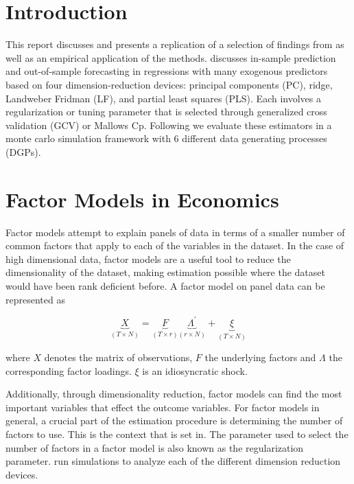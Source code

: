 \renewcommand{\contentsname}{Table of Contents}
\tableofcontents

\newpage

\section{Introduction} \label{sec::Intro}
This report discusses and presents a replication of a selection of findings from \citeauthor{carrasco2016sample} as well as an empirical application of the methods. \citeauthor{carrasco2016sample} discusses in-sample prediction and out-of-sample forecasting in regressions with many exogenous predictors based on four dimension-reduction devices: principal components (PC), ridge, Landweber Fridman (LF), and partial least squares (PLS). Each involves a regularization or tuning parameter that is selected through generalized cross validation (GCV) or Mallows Cp. Following \citeauthor{carrasco2016sample} we evaluate these estimators in a monte carlo simulation framework with 6 different data generating processes (DGPs). 

\section{Factor Models in Economics} \label{sec::Factor}

Factor models attempt to explain panels of data in terms of a smaller number of common factors that apply to each of the variables in the dataset. In the case of high dimensional data, factor models are a useful tool to reduce the dimensionality of the dataset, making estimation possible where the dataset would have been rank deficient before. A factor model on panel data can be represented as

\[\underbrace{X}_{(T \times N)} = \underbrace{F}_{(T \times r)} \underbrace{\Lambda^{'}}_{(r \times N)} + \underbrace{\xi}_{(T \times N)}\]

where $X$ denotes the matrix of observations, $F$ the underlying factors and $\Lambda$ the corresponding factor loadings. $\xi$ is an idiosyncratic shock. 

Additionally, through dimensionality reduction, factor models can find the most important variables that effect the outcome variables.
For factor models in general, a crucial part of the estimation procedure is determining the number of factors to use. This is the context that \citeauthor{carrasco2016sample} is set in. The parameter used to select the number of factors in a factor model is also known as the regularization parameter. \citeauthor{carrasco2016sample} run simulations to analyze each of the different dimension reduction devices. 

